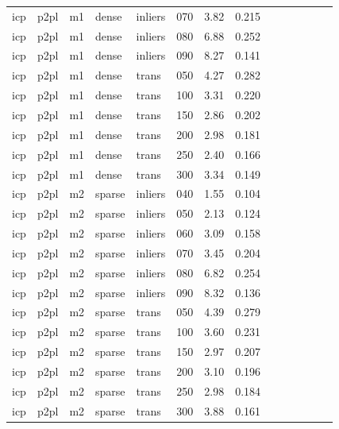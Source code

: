 \begin{table}[htbp]
\begin{tabular}{llllllrrrrrrrr}
  icp & p2pl & m1 & dense & inliers & 070 & 3.82 & 0.215 \\
  icp & p2pl & m1 & dense & inliers & 080 & 6.88 & 0.252 \\
  icp & p2pl & m1 & dense & inliers & 090 & 8.27 & 0.141 \\
  icp & p2pl & m1 & dense & trans & 050 & 4.27 & 0.282 \\
  icp & p2pl & m1 & dense & trans & 100 & 3.31 & 0.220 \\
  icp & p2pl & m1 & dense & trans & 150 & 2.86 & 0.202 \\
  icp & p2pl & m1 & dense & trans & 200 & 2.98 & 0.181 \\
  icp & p2pl & m1 & dense & trans & 250 & 2.40 & 0.166 \\
  icp & p2pl & m1 & dense & trans & 300 & 3.34 & 0.149 \\
  icp & p2pl & m2 & sparse & inliers & 040 & 1.55 & 0.104 \\
  icp & p2pl & m2 & sparse & inliers & 050 & 2.13 & 0.124 \\
  icp & p2pl & m2 & sparse & inliers & 060 & 3.09 & 0.158 \\
  icp & p2pl & m2 & sparse & inliers & 070 & 3.45 & 0.204 \\
  icp & p2pl & m2 & sparse & inliers & 080 & 6.82 & 0.254 \\
  icp & p2pl & m2 & sparse & inliers & 090 & 8.32 & 0.136 \\
  icp & p2pl & m2 & sparse & trans & 050 & 4.39 & 0.279 \\
  icp & p2pl & m2 & sparse & trans & 100 & 3.60 & 0.231 \\
  icp & p2pl & m2 & sparse & trans & 150 & 2.97 & 0.207 \\
  icp & p2pl & m2 & sparse & trans & 200 & 3.10 & 0.196 \\
  icp & p2pl & m2 & sparse & trans & 250 & 2.98 & 0.184 \\
  icp & p2pl & m2 & sparse & trans & 300 & 3.88 & 0.161 \\
\bottomrule
\end{tabular}
\end{table}
